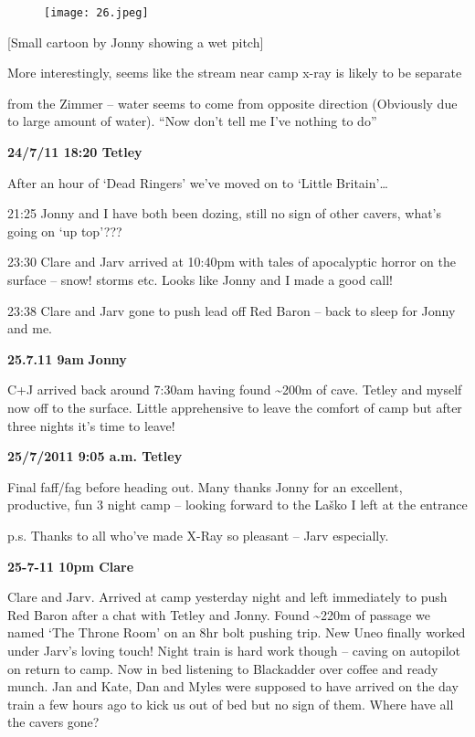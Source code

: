 \begin{figure}[htbp]
\centering
\texttt{[image: 26.jpeg]}
\caption{}
\end{figure}

{[}Small cartoon by Jonny showing a wet pitch{]}

More interestingly, seems like the stream near camp x-ray is likely to
be separate

from the Zimmer -- water seems to come from opposite direction
(Obviously due to large amount of water). ``Now don't tell me I've
nothing to do''

\textbf{24/7/11 18:20 Tetley}

After an hour of `Dead Ringers' we've moved on to `Little
Britain'\ldots{}

21:25 Jonny and I have both been dozing, still no sign of other cavers,
what's going on `up top'???

23:30 Clare and Jarv arrived at 10:40pm with tales of apocalyptic horror
on the surface -- snow! storms etc. Looks like Jonny and I made a good
call!

23:38 Clare and Jarv gone to push lead off Red Baron -- back to sleep
for Jonny and me.

\textbf{25.7.11 9am} \textbf{Jonny}

C+J arrived back around 7:30am having found \textasciitilde{}200m of
cave. Tetley and myself now off to the surface. Little apprehensive to
leave the comfort of camp but after three nights it's time to leave!

\textbf{25/7/2011 9:05 a.m. Tetley}

Final faff/fag before heading out. Many thanks Jonny for an excellent,
productive, fun 3 night camp -- looking forward to the Laško I left at
the entrance

p.s. Thanks to all who've made X-Ray so pleasant -- Jarv especially.

\textbf{25-7-11 10pm Clare}

Clare and Jarv. Arrived at camp yesterday night and left immediately to
push Red Baron after a chat with Tetley and Jonny. Found
\textasciitilde{}220m of passage we named `The Throne Room' on an 8hr
bolt pushing trip. New Uneo finally worked under Jarv's loving touch!
Night train is hard work though -- caving on autopilot on return to
camp. Now in bed listening to Blackadder over coffee and ready munch.
Jan and Kate, Dan and Myles were supposed to have arrived on the day
train a few hours ago to kick us out of bed but no sign of them. Where
have all the cavers gone?

